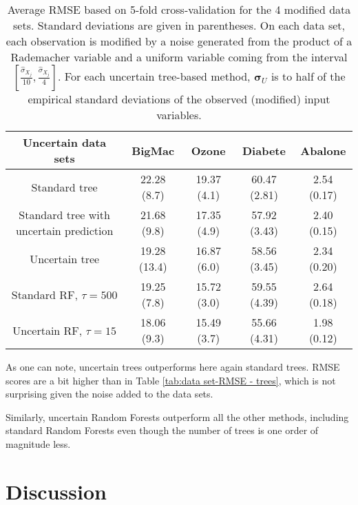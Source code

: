 \documentclass[twoside,11pt]{article}
\begin{document}
\begin{table*}[ht!]
  \centering
      \begin{tabular}{ccccc}
        Uncertain data sets  & {BigMac} &{Ozone} &{Diabete} &{Abalone} \\
        \hline
        \hline
        Standard tree & 22.28 (8.7) & 19.37 (4.1) & 60.47 (2.81) & 2.54 (0.17)\\
        Standard tree with uncertain prediction & 21.68 (9.8) & 17.35 (4.9) & 57.92 (3.43) & 2.40 (0.15)\\
      Uncertain tree & 19.28 (13.4) & 16.87 (6.0) & 58.56 (3.45) & 2.34 (0.20)\\
      \hline
         Standard RF, $\tau = 500$ & 19.25 (7.8) & 15.72 (3.0) & 59.55 (4.39) & 2.64 (0.18) \\
        Uncertain RF, $\tau = 15$ &18.06 (9.3)& 15.49 (3.7) & 55.66 (4.31) & 1.98 (0.12) \\
        \hline
      \end{tabular}
\caption{Average RMSE based on 5-fold cross-validation for the 4 modified data sets. Standard deviations are given in parentheses. On each data set, each observation is modified by a noise generated from the product of a Rademacher variable and a uniform variable coming from the interval $[\frac{\hat{\sigma}_{X_j}}{10}, \frac{\hat{\sigma}_{X_j}}{4}]$. For each uncertain tree-based method, $\boldsymbol{\sigma}_U$ is to half of the empirical standard deviations of the observed (modified) input variables.}
\label{tab:data set-RMSE - RF}

\end{table*}

As one can note, uncertain trees outperforms here again standard trees. RMSE scores are a bit higher than in Table \ref{tab:data set-RMSE - trees}, which is not surprising given the noise added to the data sets.

Similarly, uncertain Random Forests outperform all the other methods, including standard Random Forests even though the number of trees is one order of magnitude less. 

\section{Discussion}
\label{sec:disc}
\end{document}
